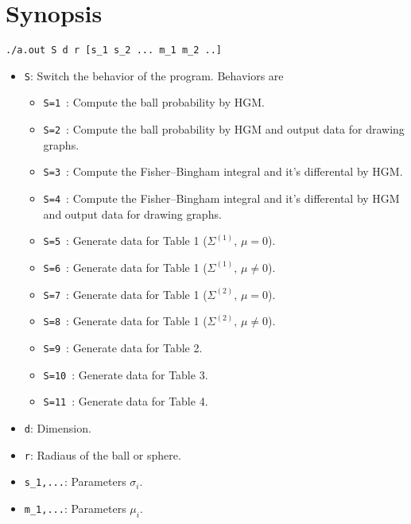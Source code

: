 \documentclass{article}
\begin{document}
\section{Synopsis}
\begin{verbatim}
./a.out S d r [s_1 s_2 ... m_1 m_2 ..]
\end{verbatim}
\begin{itemize}
\item \verb+S+\/: Switch the behavior of the program. Behaviors are
  \begin{itemize}
    \item \verb+S=1+\ : %
    Compute the ball probability by HGM.
    \item \verb+S=2+\ : %
    Compute the ball probability by HGM and output data for drawing graphs.
    \item \verb+S=3+\ : %
    Compute the Fisher--Bingham integral and it's differental by HGM.
    \item \verb+S=4+\ : %
    Compute the Fisher--Bingham integral and it's differental by HGM
    and output data for drawing graphs.
    \item \verb+S=5+\ : %
    Generate data for Table 1 ($\Sigma^{(1)},\,\mu=0$).
    \item \verb+S=6+\ : %
    Generate data for Table 1 ($\Sigma^{(1)},\,\mu\neq 0$).
    \item \verb+S=7+\ : %
    Generate data for Table 1 ($\Sigma^{(2)},\,\mu=0$).
    \item \verb+S=8+\ : %
    Generate data for Table 1 ($\Sigma^{(2)},\,\mu\neq 0$).
    \item \verb+S=9+\ : %
    Generate data for Table 2.
    \item \verb+S=10+\ : %
    Generate data for Table 3.
    \item \verb+S=11+\ : %
    Generate data for Table 4.
  \end{itemize}
\item \verb+d+\/: Dimension.
\item \verb+r+\/: Radiaus of the ball or sphere.
\item \verb+s_1,...+\/: Parameters $\sigma_i$.
\item \verb+m_1,...+\/: Parameters $\mu_i$.
\end{itemize}
\end{document}
